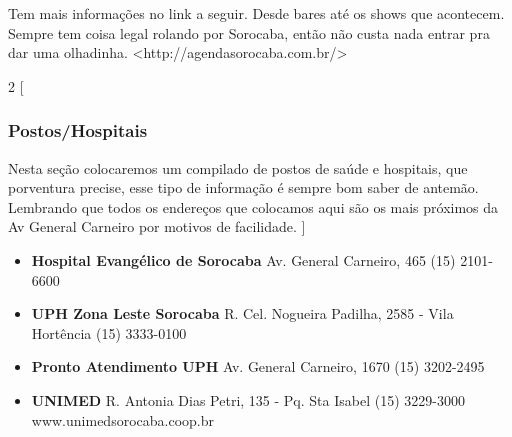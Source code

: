 Tem mais informações no link a seguir. Desde bares até os shows que acontecem. Sempre tem coisa legal rolando por Sorocaba, então não custa nada entrar pra dar uma olhadinha. <http://agendasorocaba.com.br/>

\begin{multicols}{2}
  [
  \subsubsection{Postos/Hospitais}
  Nesta seção colocaremos um compilado de postos de saúde e hospitais, que porventura precise, esse tipo de informação é sempre bom saber de antemão.
  Lembrando que todos os endereços que colocamos aqui são os mais próximos da Av General Carneiro por motivos de facilidade.
  ]
  \begin{itemize}
    \item \textbf{Hospital Evangélico de Sorocaba}
      \newline Av. General Carneiro, 465
      \newline (15) 2101-6600
  \end{itemize}
  \begin{itemize}
    \item \textbf{UPH Zona Leste Sorocaba}
      \newline R. Cel. Nogueira Padilha, 2585 - Vila Hortência
      \newline (15) 3333-0100
  \end{itemize}
  \begin{itemize}
    \item \textbf{Pronto Atendimento UPH}
      \newline Av. General Carneiro, 1670
      \newline (15) 3202-2495
  \end{itemize}
  \begin{itemize}
    \item \textbf{UNIMED}
	\newline R. Antonia Dias Petri, 135 - Pq. Sta Isabel
	\newline (15) 3229-3000
	\newline www.unimedsorocaba.coop.br
  \end{itemize}
\end{multicols}

